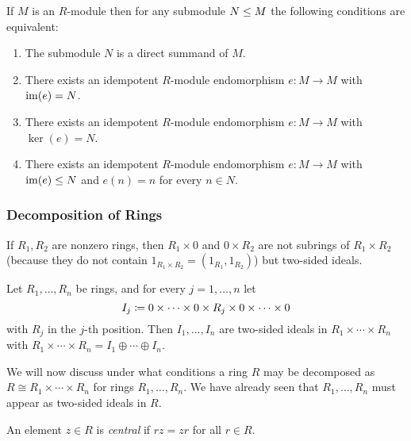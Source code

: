 \begin{corollary}
  If $M$ is an $R$-module then for any submodule $N \leq M$ the following conditions are equivalent:
  \begin{enumerate}
    \item
      The submodule $N$ is a direct summand of $M$.
    \item
      There exists an idempotent $R$-module endomorphism $e \colon M \to M$ with $\operatorname{im}(e) = N$.
    \item
      There exists an idempotent $R$-module endomorphism $e \colon M \to M$ with $\ker(e) = N$.
    \item
      There exists an idempotent $R$-module endomorphism $e \colon M \to M$ with $\operatorname{im}(e) \leq N$ and $e(n) = n$ for every $n \in N$.
  \end{enumerate}
\end{corollary}



\subsubsection{Decomposition of Rings}


\begin{fluff}
  If $R_1, R_2$ are nonzero rings, then $R_1 \times 0$ and $0 \times R_2$ are not subrings of $R_1 \times R_2$ (because they do not contain $1_{R_1 \times R_2} = (1_{R_1}, 1_{R_2})$) but two-sided ideals.
\end{fluff}


\begin{lemma}
  Let $R_1, \dotsc, R_n$ be rings, and for every $j = 1, \dotsc, n$ let
  \[
              I_j
    \coloneqq  0 \times \dotsb \times 0 \times R_j \times 0 \times \dotsb \times 0
  \]
  with $R_j$ in the $j$-th position.
  Then $I_1, \dotsc, I_n$ are two-sided ideals in $R_1 \times \dotsb \times R_n$ with $R_1 \times \dotsb \times R_n = I_1 \oplus \dotsb \oplus I_n$.
\end{lemma}


\begin{fluff}
  We will now discuss under what conditions a ring $R$ may be decomposed as $R \cong R_1 \times \dotsb \times R_n$ for rings $R_1, \dotsc, R_n$.
  We have already seen that $R_1, \dotsc, R_n$ must appear as two-sided ideals in $R$.
\end{fluff}


\begin{definition}
  An element $z \in R$ is \emph{central} if $rz = zr$ for all $r \in R$.
\end{definition}


